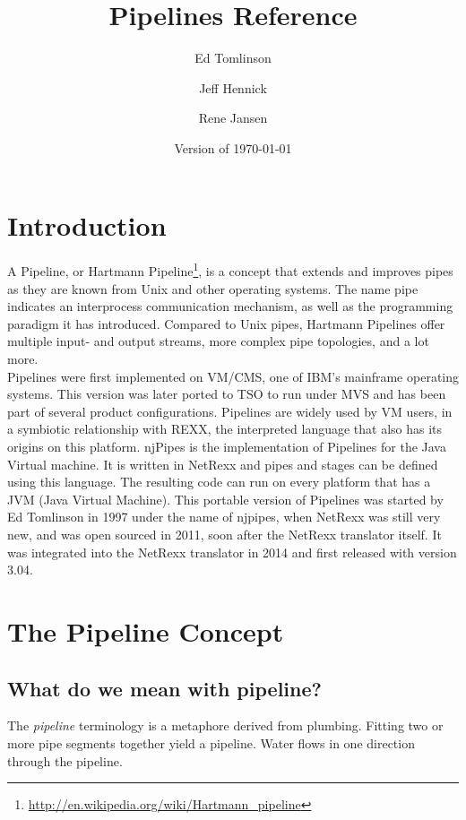 

\renewcommand{\isbn}{978-90-819090-3-7}    
\setcounter{tocdepth}{1} 
\title{Pipelines Reference}
\author{Ed Tomlinson \and Jeff Hennick \and Rene Jansen}
\date{Version  of \today}
\maketitle
{}
\pagestyle{plain}
\frontmatter
{}
\pagestyle{plain}

\tableofcontents
\newpage
{}
\frontmatter
\large


\mainmatter
\chapter{Introduction}
A Pipeline, or Hartmann Pipeline\footnote{\url{http://en.wikipedia.org/wiki/Hartmann_pipeline}}, is a concept that extends and improves pipes as they are known from Unix and other operating systems. The name pipe indicates an interprocess communication mechanism, as well as the programming paradigm it has introduced. Compared to Unix pipes, Hartmann Pipelines offer multiple input- and output streams, more complex pipe topologies, and a lot more.\\
Pipelines were first implemented on VM/CMS, one of IBM's mainframe operating systems. This version was later ported to TSO to run under MVS and has been part of several product configurations. Pipelines are widely used by VM users, in a symbiotic relationship with REXX, the interpreted language that also has its origins on this platform.
njPipes is the implementation of Pipelines for the Java Virtual
machine. It is written in NetRexx and pipes and stages can be defined using this
language. The resulting code can run on every platform that has a JVM
(Java Virtual Machine). This portable version of Pipelines was started
by Ed Tomlinson in 1997 under the name of njpipes, when NetRexx was
still very new, and was open sourced in 2011, soon after the NetRexx
translator itself. It was integrated into the NetRexx translator in
2014 and first released with version 3.04.

\chapter{The Pipeline Concept}
\section{What do we mean with pipeline?}
The \emph{pipeline} terminology is a metaphore derived from
plumbing. Fitting two or more pipe segments together yield a
pipeline. Water flows in one direction through the pipeline.

